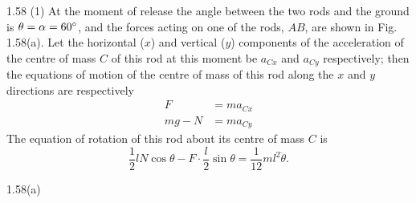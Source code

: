 \begin{solution}{1.58}
(1) At the moment of release the angle between the two rods and the ground is $\theta=\alpha=60^{\circ}$, and the forces acting on one of the rods, $AB$, are shown in Fig. 1.58(a). Let the horizontal ($x$) and vertical ($y$) components of the acceleration of the centre of mass $C$ of this rod at this moment be $a_{Cx}$ and $a_{Cy}$ respectively; then the equations of motion of the centre of mass of this rod along the $x$ and $y$ directions are respectively
\begin{align}
F&=ma_{Cx} \tag{1}\\
mg-N&=ma_{Cy} \tag{2}
\end{align}
The equation of rotation of this rod about its centre of mass $C$ is
\begin{equation}
\frac{1}{2}lN\cos\theta-F\cdot\frac{l}{2}\sin\theta=\frac{1}{12}ml^2\ddot{\theta}. \tag{3}
\end{equation}

\begin{figbox}{1.58(a)}
\end{figbox}


\end{solution}
